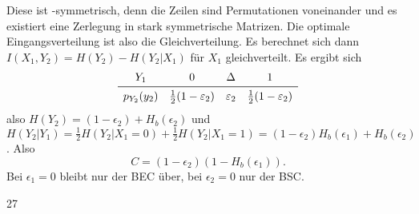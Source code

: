 \documentclass{article}
\begin{document}
\begin{solution}
\begin{tasks}
Diese ist -symmetrisch, denn die Zeilen sind Permutationen voneinander und es existiert eine Zerlegung in stark symmetrische Matrizen. Die optimale Eingangsverteilung ist also die Gleichverteilung.
Es berechnet sich dann $I(X_1,Y_2)=H(Y_2)-H(Y_2|X_1)$ für $X_1$ gleichverteilt. Es ergibt sich
$$
\begin{matrix}
    Y_1 & 0 & \Delta & 1 \\
    \midrule
    p_{Y_2}(y_2) & \frac 1 2(1-\epsilon_2) & \epsilon_2 & \frac 1 2 (1-\epsilon_2)
\end{matrix}
$$
also $H(Y_2)=(1-\epsilon_2)+H_b(\epsilon_2)$ und $H(Y_2|Y_1)=\frac 1 2 H(Y_2|X_1=0) + \frac 1 2 H(Y_2|X_1=1)=(1-\epsilon_2)H_b(\epsilon_1)+H_b(\epsilon_2)$. Also
$$C=(1-\epsilon_2)(1-H_b(\epsilon_1)).$$
Bei $\epsilon_1=0$ bleibt nur der BEC über, bei $\epsilon_2=0$ nur der BSC.
    \end{tasks}
\end{solution}
27
\end{document}
